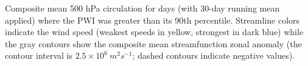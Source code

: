 \label{fig:pwi_spatial_summary}
Composite mean 500 hPa circulation for days (with 30-day running mean applied) where the PWI was greater than its 90th percentile. Streamline colors indicate the wind speed (weakest speeds in yellow, strongest in dark blue) while the gray contours show the composite mean streamfunction zonal anomaly (the contour interval is $2.5 \times 10^6 \: m^2 s^{-1}$; dashed contours indicate negative values). 